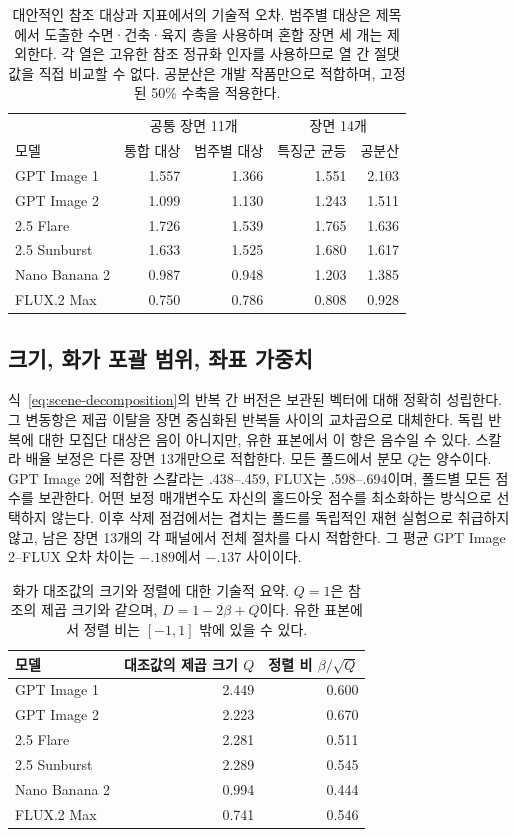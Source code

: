 \documentclass[11pt,a4paper]{article}
\begin{document}
\begin{table}[H]
\centering\small
\begin{tabular}{@{}lrrrr@{}}
\toprule
 & \multicolumn{2}{c}{공통 장면 11개} & \multicolumn{2}{c}{장면 14개}\\
모델 & 통합 대상 & 범주별 대상 & 특징군 균등 & 공분산\\\midrule
GPT Image 1 & 1.557 & 1.366 & 1.551 & 2.103\\
GPT Image 2 & 1.099 & 1.130 & 1.243 & 1.511\\
2.5 Flare & 1.726 & 1.539 & 1.765 & 1.636\\
2.5 Sunburst & 1.633 & 1.525 & 1.680 & 1.617\\
Nano Banana 2 & 0.987 & 0.948 & 1.203 & 1.385\\
FLUX.2 Max & 0.750 & 0.786 & 0.808 & 0.928\\
\bottomrule
\end{tabular}
\caption{대안적인 참조 대상과 지표에서의 기술적 오차. 범주별 대상은 제목에서 도출한 수면·건축·육지 층을 사용하며 혼합 장면 세 개는 제외한다. 각 열은 고유한 참조 정규화 인자를 사용하므로 열 간 절댓값을 직접 비교할 수 없다. 공분산은 개발 작품만으로 적합하며, 고정된 50\% 수축을 적용한다.}
\label{tab:review-targets}
\end{table}
\FloatBarrier

\subsection{크기, 화가 포괄 범위, 좌표 가중치}\label{app:magnitude-coverage}
식~\ref{eq:scene-decomposition}의 반복 간 버전은 보관된 벡터에 대해 정확히 성립한다. 그 변동항은 제곱 이탈을 장면 중심화된 반복들 사이의 교차곱으로 대체한다. 독립 반복에 대한 모집단 대상은 음이 아니지만, 유한 표본에서 이 항은 음수일 수 있다. 스칼라 배율 보정은 다른 장면 13개만으로 적합한다. 모든 폴드에서 분모 $Q$는 양수이다. GPT Image 2에 적합한 스칼라는 .438--.459, FLUX는 .598--.694이며, 폴드별 모든 점수를 보관한다. 어떤 보정 매개변수도 자신의 홀드아웃 점수를 최소화하는 방식으로 선택하지 않는다. 이후 삭제 점검에서는 겹치는 폴드를 독립적인 재현 실험으로 취급하지 않고, 남은 장면 13개의 각 패널에서 전체 절차를 다시 적합한다. 그 평균 GPT Image 2--FLUX 오차 차이는 $-.189$에서 $-.137$ 사이이다.

\begin{table}[H]
\centering\small
\begin{tabular}{@{}lrr@{}}
\toprule
모델 & 대조값의 제곱 크기 $Q$ & 정렬 비 $\beta/\sqrt Q$\\\midrule
GPT Image 1 & 2.449 & 0.600\\
GPT Image 2 & 2.223 & 0.670\\
2.5 Flare & 2.281 & 0.511\\
2.5 Sunburst & 2.289 & 0.545\\
Nano Banana 2 & 0.994 & 0.444\\
FLUX.2 Max & 0.741 & 0.546\\
\bottomrule
\end{tabular}
\caption{화가 대조값의 크기와 정렬에 대한 기술적 요약. $Q=1$은 참조의 제곱 크기와 같으며, $D=1-2\beta+Q$이다. 유한 표본에서 정렬 비는 $[-1,1]$ 밖에 있을 수 있다.}
\label{tab:review-alignment}
\end{table}
\end{document}
